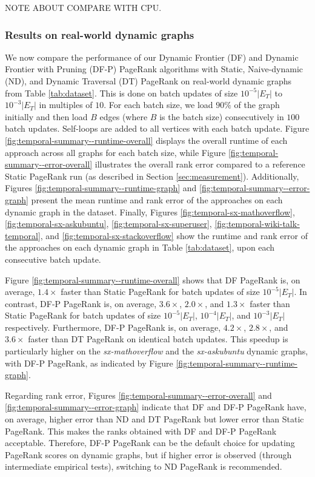 NOTE ABOUT COMPARE WITH CPU.

\subsubsection{Results on real-world dynamic graphs}

We now compare the performance of our Dynamic Frontier (DF) and Dynamic Frontier with Pruning (DF-P) PageRank algorithms with Static, Naive-dynamic (ND), and Dynamic Traversal (DT) PageRank on real-world dynamic graphs from Table \ref{tab:dataset}. This is done on batch updates of size $10^{-5}|E_T|$ to $10^{-3}|E_T|$ in multiples of $10$. For each batch size, we load $90\%$ of the graph initially and then load $B$ edges (where $B$ is the batch size) consecutively in $100$ batch updates. Self-loops are added to all vertices with each batch update. Figure \ref{fig:temporal-summary--runtime-overall} displays the overall runtime of each approach across all graphs for each batch size, while Figure \ref{fig:temporal-summary--error-overall} illustrates the overall rank error compared to a reference Static PageRank run (as described in Section \ref{sec:measurement}). Additionally, Figures \ref{fig:temporal-summary--runtime-graph} and \ref{fig:temporal-summary--error-graph} present the mean runtime and rank error of the approaches on each dynamic graph in the dataset. Finally, Figures \ref{fig:temporal-sx-mathoverflow}, \ref{fig:temporal-sx-askubuntu}, \ref{fig:temporal-sx-superuser}, \ref{fig:temporal-wiki-talk-temporal}, and \ref{fig:temporal-sx-stackoverflow} show the runtime and rank error of the approaches on each dynamic graph in Table \ref{tab:dataset}, upon each consecutive batch update.

Figure \ref{fig:temporal-summary--runtime-overall} shows that DF PageRank is, on average, $1.4\times$ faster than Static PageRank for batch updates of size $10^{-5}|E_T|$. In contrast, DF-P PageRank is, on average, $3.6\times$, $2.0\times$, and $1.3\times$ faster than Static PageRank for batch updates of size $10^{-5}|E_T|$, $10^{-4}|E_T|$, and $10^{-3}|E_T|$ respectively. Furthermore, DF-P PageRank is, on average, $4.2\times$, $2.8\times$, and $3.6\times$ faster than DT PageRank on identical batch updates. This speedup is particularly higher on the \textit{sx-mathoverflow} and the \textit{sx-askubuntu} dynamic graphs, with DF-P PageRank, as indicated by Figure \ref{fig:temporal-summary--runtime-graph}.

Regarding rank error, Figures \ref{fig:temporal-summary--error-overall} and \ref{fig:temporal-summary--error-graph} indicate that DF and DF-P PageRank have, on average, higher error than ND and DT PageRank but lower error than Static PageRank. This makes the ranks obtained with DF and DF-P PageRank acceptable. Therefore, DF-P PageRank can be the default choice for updating PageRank scores on dynamic graphs, but if higher error is observed (through intermediate empirical tests), switching to ND PageRank is recommended.


